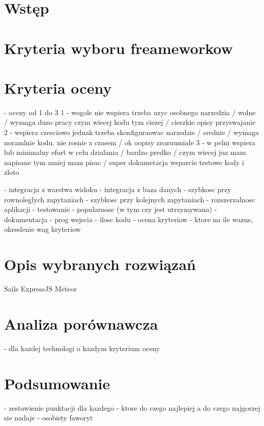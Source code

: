 \documentclass[12pt]{report}
\begin{document}
\tableofcontents

\chapter{Wstęp}
\chapter{Kryteria wyboru freameworkow}
\chapter{Kryteria oceny}
- oceny od 1 do 3 1 - wogole nie wspiera trzeba uzyc osobnego narzedzia / wolne / wymaga duzo pracy czym wiecej kodu tym ciezej / cieszkie opisy przyswajanie
2 - wspiera czesciowo jednak trzeba skonfiguraowac narzedzie / srednie / wymaga noramlnie kodu. nie rosnie z czasem / ok oopisy zrozuumiale
3 - w pelni wspiera lub minimalny efort w celu dzialania / bardzo predko / czym wiecej juz mam napisane tym mniej mam pisac / super dokumetacja wsparcie testowe kody i zloto

- integracja z warstwa widoku
- integracja z baza danych
- szybkosc przy rownoleglych zapytaniach
- szybkosc przy kolejnych zapytaniach
- rozszerzalnosc aplikacji
- testowanie
- popularnosc (w tym czy jest utrzymywana)
- dokumentacja
- prog wejscia
- ilosc kodu 
- ocena kryteriow - ktore na ile wazne, okreslenie wag kryteriow

\chapter{Opis wybranych rozwiązań}
Sails
ExpressJS
Meteor
\chapter{Analiza porównawcza}
- dla kazdej technologi o kazdym kryterium oceny
\chapter{Podsumowanie}
- zestawienie punktacji dla kazdego
- ktore do czego najlepiej a do czego najgorzej sie nadaje
- osobisty faworyt
\end{document}
